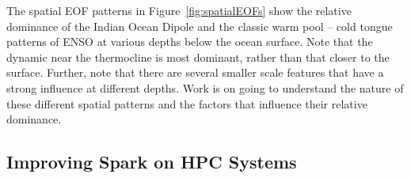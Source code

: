 The spatial EOF patterns in Figure~\ref{fig:spatialEOFs} show the relative
dominance of the Indian Ocean Dipole and the classic warm pool -- cold tongue
patterns of ENSO at various depths below the ocean surface. Note that the
dynamic near the thermocline is most dominant, rather than that closer to the
surface. Further, note that there are several smaller scale features that
have a strong influence at different depths. Work is on going to understand
the nature of these different spatial patterns and the factors that influence
their relative dominance.

  \subsection{Improving Spark on HPC Systems}

  \label{sect:lessons}
  
  

